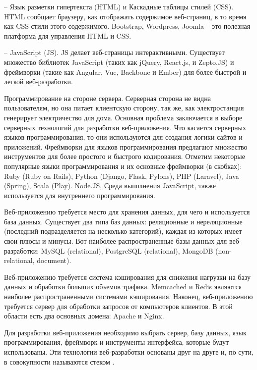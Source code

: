 -- Язык разметки гипертекста (HTML) и Каскадные таблицы стилей (CSS).
HTML сообщает браузеру, как отображать содержимое веб-страниц, в то время как CSS-стили этого содержимого.
Bootstrap, Wordpress, Joomla – это полезная платформа для управления HTML и CSS.

-- JavaScript (JS). JS делает веб-страницы интерактивными.
Существует множество библиотек JavaScript (таких как jQuery, React.js, и Zepto.JS) и фреймворки (такие как Angular, Vue, Backbone и Ember) для более быстрой и легкой веб-разработки.

Программирование на стороне сервера.
Серверная сторона не видна пользователям, но она питает клиентскую сторону, так же, как электростанция генерирует электричество для дома.
Основная проблема заключается в выборе серверных технологий для разработки веб-приложения.
Что касается серверных языков программирования, то они используются для создания логики сайтов и приложений.
Фреймворки для языков программирования предлагают множество инструментов для более простого и быстрого кодирования.
Отметим некоторые популярные языки программирования и их основные фреймворки (в скобках): Ruby (Ruby on Rails), Python (Django, Flask, Pylons), PHP (Laravel), Java (Spring), Scala (Play).
Node.JS, Среда выполнения JavaScript, также используется для внутреннего программирования.

Веб-приложению требуется место для хранения данных, для чего и используется база данных.
Существует два типа баз данных: реляционные и нереляционные (последний подразделяется на несколько категорий), каждая из которых имеет свои плюсы и минусы.
Вот наиболее распространенные базы данных для веб-разработки: MySQL (relational), PostgreSQL (relational), MongoDB (non-relational, document).

Веб-приложению требуется система кэширования для снижения нагрузки на базу данных и обработки больших объемов трафика.
Memcached и Redis являются наиболее распространенными системами кэширования.
Наконец, веб-приложению требуется сервер для обработки запросов от компьютеров клиентов.
В этой области есть два основных домена: Apache и Nginx.

Для разработки веб-приложения необходимо выбрать сервер, базу данных, язык программирования, фреймворк и инструменты интерфейса, которые будут использованы.
Эти технологии веб-разработки основаны друг на друге и, по сути, в совокупности называются стеком \cite{ualiev-jebegenov-issledovanie-1}.

